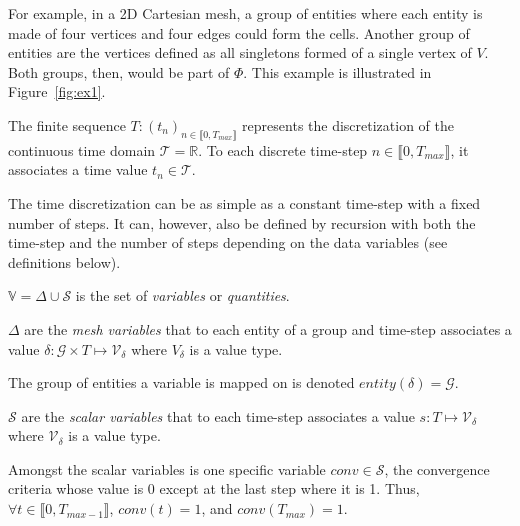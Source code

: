 For example, in a 2D Cartesian mesh, a group of entities where each entity is made of four vertices and four edges could form the cells.
Another group of entities are the vertices defined as all singletons formed of a single vertex of $V$. Both groups, then, would be part of $\Phi$. This example is illustrated in Figure~\ref{fig:ex1}.

\medskip

\begin{mydef}
The finite sequence $T: (t_n)_{n\in\llbracket 0, T_{max} \rrbracket}$ represents the discretization of the continuous time domain $\mathcal{T}=\mathbb{R}$.
To each discrete time-step $n\in\llbracket 0, T_{max} \rrbracket$, it associates a time value $t_n\in\mathcal{T}$.
\end{mydef}

The time discretization can be as simple as a constant time-step with a fixed number of steps.
It can, however, also be defined by recursion with both the time-step and the number of steps depending on the data variables (see definitions below).

\medskip

\begin{mydefs}
\item $\mathbb{V}=\Delta\cup\mathcal{S}$ is the set of \emph{variables} or \emph{quantities}.
\item $\Delta$ are the \textit{mesh variables} that to each entity of a group and time-step associates a value $\delta: \mathcal{G}\times T\mapsto \mathcal{V}_\delta$ where $V_{\delta}$ is a value type.
\item The group of entities a variable is mapped on is denoted $entity(\delta)=\mathcal{G}$.
\item $\mathcal{S}$ are the \textit{scalar variables} that to each time-step associates a value $s: T\mapsto \mathcal{V}_\delta$ where $\mathcal{V}_{\delta}$ is a value type.
\item Amongst the scalar variables is one specific variable $conv\in\mathcal{S}$, the convergence criteria whose value is $0$ except at the last step where it is 1. Thus, $\forall t\in \llbracket 0, T_{max-1} \rrbracket$, $conv(t)=1$, and $conv(T_{max})=1$.
\end{mydefs}


